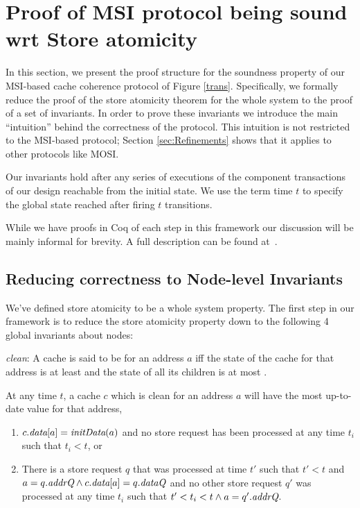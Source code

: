 \section{Proof of MSI protocol being sound wrt Store atomicity}
\label{safety}

In this section, we present the proof structure for the soundness property of our
MSI-based cache coherence protocol of Figure \ref{trans}. Specifically, we
formally reduce the proof of the store atomicity theorem for the whole system
to the proof of a set of invariants. In order to prove these invariants we
introduce the main ``intuition'' behind the correctness of the protocol. This
intuition is not restricted to the MSI-based protocol; Section
\ref{sec:Refinements} shows that it applies to other protocols like MOSI.

Our invariants hold after any series of executions of the component
transactions of our design reachable from the initial state. We use
the term time $t$ to specify the global state reached after firing $t$
transitions.

While we have proofs in Coq of each step in this framework our
discussion will be mainly informal for brevity. A full description can
be found at~.

\subsection{Reducing correctness to Node-level Invariants}

We've defined store atomicity to be a whole system property. The first step in
our framework is to reduce the store atomicity property down to the following 4
global invariants about nodes:

\begin{defn}
\textit{clean}: A cache is said to be \clean{} for an address $a$ iff
the state of the cache for that address is at least \Sh{} and the
state of all its children is at most \Sh.
\end{defn}
\begin{inv}
At any time $t$, a cache $c$ which is clean for an address $a$ will have the most
up-to-date value for that address, \ie{}
\begin{enumerate}
\item $c.\textit{data}[a] = \textit{initData}(a)$ and no store request has been
  processed at any time $t_i$ such that $t_i < t$, or
\item There is a store request $q$ that was processed at time $t'$ such that
$t' < t$ and $a = q.\textit{addrQ} \wedge c.\textit{data}[a] = q.\textit{dataQ}$ and no other store
request $q'$ was processed at any time $t_i$ such that $t' < t_i < t \wedge a =
q'.\textit{addrQ}$.
\end{enumerate}
\label{latestValue}
\end{inv}

